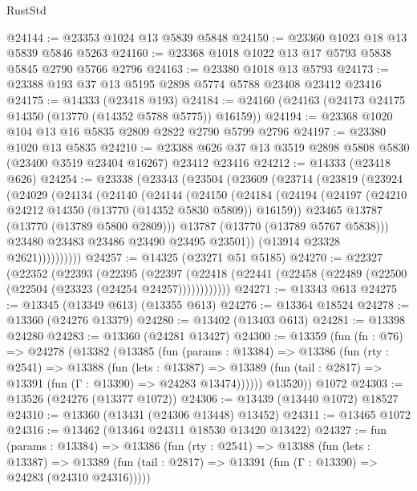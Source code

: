 \begin{lexlean}{RustStd}
\begin{coremodule}
@24144 := @23353 @1024 @13 @5839 @5848
@24150 := @23360 @1023 @18 @13 @5839 @5846 @5263
@24160 := @23368 @1018 @1022 @13 @17 @5793 @5838 @5845 @2790 @5766 @2796
@24163 := @23380 @1018 @13 @5793
@24173 := @23388 @193 @37 @13 @5195 @2898 @5774 @5788 @23408 @23412 @23416
@24175 := @14333 (@23418 @193)
@24184 := @24160 (@24163 (@24173 @24175 @14350 (@13770 (@14352 @5788 @5775)) @16159))
@24194 := @23368 @1020 @104 @13 @16 @5835 @2809 @2822 @2790 @5799 @2796
@24197 := @23380 @1020 @13 @5835
@24210 := @23388 @626 @37 @13 @3519 @2898 @5808 @5830 (@23400 @3519 @23404 @16267) @23412 @23416
@24212 := @14333 (@23418 @626)
@24254 := @23338
    (@23343
      (@23504
        (@23609
          (@23714
            (@23819
              (@23924
                (@24029
                  (@24134
                    (@24140
                      (@24144
                        (@24150
                          (@24184
                            (@24194
                              (@24197 (@24210 @24212 @14350 (@13770 (@14352 @5830 @5809)) @16159))
                              @23465
                              @13787
                              (@13770 (@13789 @5800 @2809)))
                            @13787
                            (@13770 (@13789 @5767 @5838)))
                          @23480
                          @23483
                          @23486
                          @23490
                          @23495
                          @23501))
                      (@13914 @23328 @2621))))))))))
@24257 := @14325 (@23271 @51 @5185)
@24270 := @22327
    (@22352
      (@22393
        (@22395
          (@22397 (@22418 (@22441 (@22458 (@22489 (@22500 (@22504 (@23323 (@24254 @24257))))))))))))
@24271 := @13343 @613
@24275 := @13345 (@13349 @613) (@13355 @613)
@24276 := @13364 @18524
@24278 := @13360 (@24276 @13379)
@24280 := @13402 (@13403 @613)
@24281 := @13398 @24280
@24283 := @13360 (@24281 @13427)
@24300 := @13359
    (fun (fn : @76) =>
    @24278
      (@13382
        (@13385
          (fun (params : @13384) =>
          @13386
            (fun (rty : @2541) =>
            @13388
              (fun (lets : @13387) =>
              @13389 (fun (tail : @2817) => @13391 (fun (Γ : @13390) => @24283 @13474))))))
        @13520))
    @1072
@24303 := @13526 (@24276 (@13377 @1072))
@24306 := @13439 (@13440 @1072) @18527
@24310 := @13360 (@13431 (@24306 @13448) @13452)
@24311 := @13465 @1072
@24316 := @13462 (@13464 @24311 @18530 @13420 @13422)
@24327 := fun (params : @13384) =>
  @13386
    (fun (rty : @2541) =>
    @13388
      (fun (lets : @13387) =>
      @13389 (fun (tail : @2817) => @13391 (fun (Γ : @13390) => @24283 (@24310 @24316)))))

\end{coremodule}
\end{lexlean}
